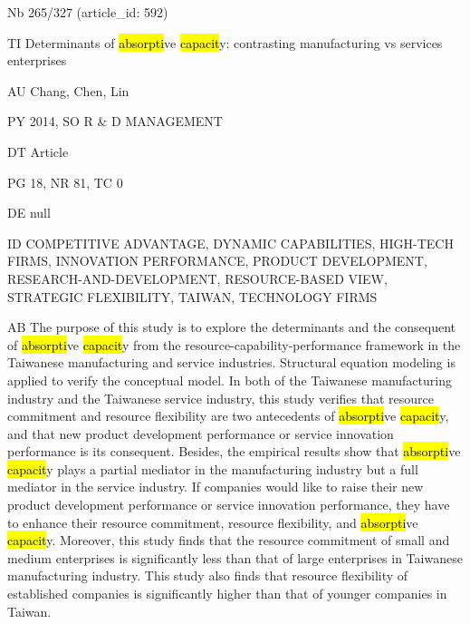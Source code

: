 \documentclass[a4paper]{article}
\begin{document}
\vspace*{-2cm}
Nb \tabto{0cm}265/327 (article\_id: 592)\par
TI \tabto{0cm}Determinants of \hl{absorpti}ve \hl{capacit}y: contrasting manufacturing vs services enterprises\par
AU \tabto{0cm}Chang, Chen, Lin\par
PY \tabto{0cm}2014, SO R \& D MANAGEMENT\par
DT \tabto{0cm}Article\par
PG \tabto{0cm}18, NR 81, TC 0\par
DE \tabto{0cm}null\par
ID \tabto{0cm}COMPETITIVE ADVANTAGE, DYNAMIC CAPABILITIES, HIGH-TECH FIRMS, INNOVATION PERFORMANCE, PRODUCT DEVELOPMENT, RESEARCH-AND-DEVELOPMENT, RESOURCE-BASED VIEW, STRATEGIC FLEXIBILITY, TAIWAN, TECHNOLOGY FIRMS\par
AB \tabto{0cm}The purpose of this study is to explore the determinants and the consequent of \hl{absorpti}ve \hl{capacit}y from the resource-capability-performance framework in the Taiwanese manufacturing and service industries. Structural equation modeling is applied to verify the conceptual model. In both of the Taiwanese manufacturing industry and the Taiwanese service industry, this study verifies that resource commitment and resource flexibility are two antecedents of \hl{absorpti}ve \hl{capacit}y, and that new product development performance or service innovation performance is its consequent. Besides, the empirical results show that \hl{absorpti}ve \hl{capacit}y plays a partial mediator in the manufacturing industry but a full mediator in the service industry. If companies would like to raise their new product development performance or service innovation performance, they have to enhance their resource commitment, resource flexibility, and \hl{absorpti}ve \hl{capacit}y. Moreover, this study finds that the resource commitment of small and medium enterprises is significantly less than that of large enterprises in Taiwanese manufacturing industry. This study also finds that resource flexibility of established companies is significantly higher than that of younger companies in Taiwan.\par
\clearpage
\end{document}
